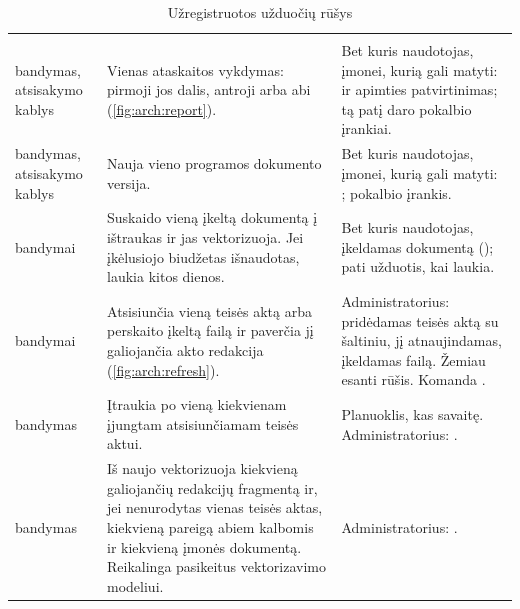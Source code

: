 \begin{xltabular}{\textwidth}{@{}L{37mm}YL{43mm}@{}}
\caption{Užregistruotos užduočių rūšys}\label{tab:arch:kinds}\\
\toprule
{} &  &  \\
\midrule
\endfirsthead
\toprule
{} &  &  \\
\midrule
\endhead
\bottomrule
\endlastfoot
{}\newline {} bandymas, atsisakymo kablys & Vienas ataskaitos vykdymas: pirmoji jos dalis, antroji arba abi (\cref{fig:arch:report}). & Bet kuris naudotojas, įmonei, kurią gali matyti:  ir apimties patvirtinimas; tą patį daro pokalbio įrankiai. \\
\newline {} bandymas, atsisakymo kablys & Nauja vieno programos dokumento versija. & Bet kuris naudotojas, įmonei, kurią gali matyti: ; pokalbio įrankis. \\
\newline {} bandymai & Suskaido vieną įkeltą dokumentą į ištraukas ir jas vektorizuoja. Jei įkėlusiojo biudžetas išnaudotas, laukia kitos dienos. & Bet kuris naudotojas, įkeldamas dokumentą (); pati užduotis, kai laukia. \\
\newline {} bandymai & Atsisiunčia vieną teisės aktą arba perskaito įkeltą failą ir paverčia jį galiojančia akto redakcija (\cref{fig:arch:refresh}). & Administratorius: pridėdamas teisės aktą su šaltiniu, jį atnaujindamas, įkeldamas failą. Žemiau esanti rūšis. Komanda . \\
\newline {} bandymas & Įtraukia po vieną  kiekvienam įjungtam atsisiunčiamam teisės aktui. & Planuoklis, kas savaitę. Administratorius: . \\
\newline {} bandymas & Iš naujo vektorizuoja kiekvieną galiojančių redakcijų fragmentą ir, jei nenurodytas vienas teisės aktas, kiekvieną pareigą abiem kalbomis ir kiekvieną įmonės dokumentą. Reikalinga pasikeitus vektorizavimo modeliui. & Administratorius: . \\

\end{xltabular}
